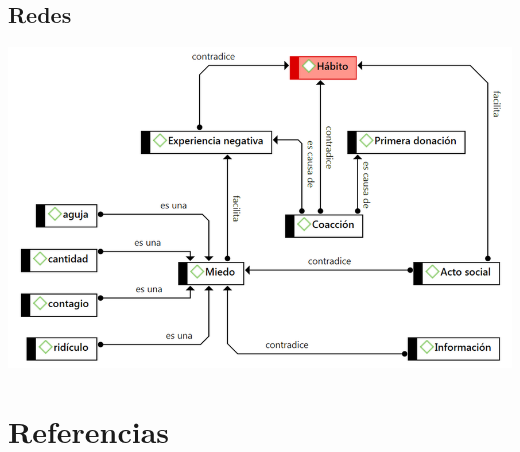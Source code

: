 \hypertarget{relaciones-codigos-donacion}{%
\subsection{Redes}\label{relaciones-codigos-donacion}}

\includegraphics{imagenes-atlas-8/red-donacion.png}

\hypertarget{referencias}{%
\section{Referencias}\label{referencias}}

\hypertarget{section-7}{%
\subsection{}\label{section-7}}
